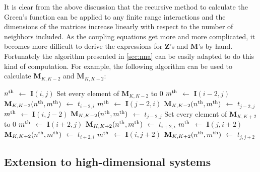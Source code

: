 It is clear from the above discussion that the recursive method to calculate the Green's function can be applied to 
any finite range interactions and the dimensions of the matrices increase linearly with respect to the number of 
neighbors included. As the coupling equations get more and more complicated, it becomes more difficult to derive 
the expressions for $\mathbf{Z}$'s and $\mathbf{M}$'s by hand. Fortunately the algorithm presented in 
\autoref{sec:nna} can be easily adapted to do this kind of computation. For example, the following algorithm can
be used to calculate $\mathbf{M}_{K,K-2}$ and $\mathbf{M}_{K,K+2}$:
\begin{algorithmic}[1]
     \State $n^{\rm th}$ $\gets$ $\mathbf{I}(i,j)$
     \State Set every element of $\mathbf{M}_{K,K-2}$ to 0
                   \State $m^{\rm th}$ $\gets$ $ \mathbf{I}(i-2, j)$  
                   \State $\mathbf{M}_{K,K-2}(n^{\rm th}, m^{\rm th})$ $\gets$ $t_{i-2, i}$
       \EndIf
%
                   \State $m^{\rm th}$ $\gets$ $ \mathbf{I}(j-2, i)$  
                   \State $\mathbf{M}_{K,K-2}(n^{\rm th}, m^{\rm th})$ $\gets$ $t_{j-2, j}$
       \EndIf
%
                   \State $m^{\rm th}$ $\gets$ $ \mathbf{I}(i, j-2)$  
                   \State $\mathbf{M}_{K,K-2}(n^{\rm th}, m^{\rm th})$ $\gets$ $t_{j-2, j}$
       \EndIf
        \State Set every element of $\mathbf{M}_{K,K+2}$ to 0
                   \State $m^{\rm th}$ $\gets$ $ \mathbf{I}(i+2, j)$  
                   \State $\mathbf{M}_{K,K+2}(n^{\rm th}, m^{\rm th})$ $\gets$ $t_{i+2, i}$ 
       \EndIf
%
                   \State $m^{\rm th}$ $\gets$ $ \mathbf{I}(j, i+2)$  
                   \State $\mathbf{M}_{K,K+2}(n^{\rm th}, m^{\rm th})$ $\gets$ $t_{i+2, i}$ 
       \EndIf
%
                   \State $m^{\rm th}$ $\gets$ $ \mathbf{I}(i, j+2)$  
                   \State $\mathbf{M}_{K,K+2}(n^{\rm th}, m^{\rm th})$ $\gets$ $t_{j, j+2}$
       \EndIf
\EndFor
\end{algorithmic}


\subsection{Extension to high-dimensional systems}
\label{sec:high-dimension}

